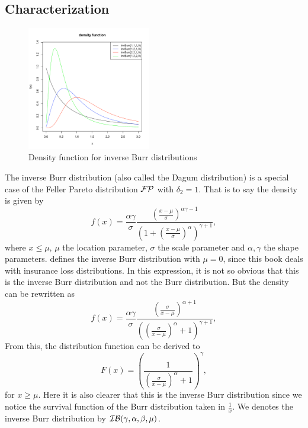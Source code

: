 \subsection{Characterization}
\begin{figure}
  \vspace{-40pt}
  \begin{center}
    \includegraphics[width=0.48\textwidth]{img/invburrzoom}
  \end{center}
  \vspace{-20pt}  
  \caption{Density function for inverse Burr distributions}
  \vspace{-20pt}  
\end{figure}
The inverse Burr distribution (also called the Dagum distribution) is a special case of the Feller Pareto distribution $\mathcal F\mathcal P$ with $\delta_2=1$. That is to say the density is given by
$$
f(x) = \frac{\alpha\gamma}{\sigma} \frac{\left(\frac{x-\mu}{\sigma}\right)^{\alpha\gamma-1}}{\left(1+\left(\frac{x-\mu}{\sigma}\right)^{\alpha}\right)^{\gamma+1}},
$$
where $x\leq \mu$, $\mu$ the location parameter, $\sigma $ the scale parameter and $\alpha,\gamma$ the shape parameters. \cite{klugman} defines the inverse Burr distribution with $\mu=0$, 
since this book deals with insurance loss distributions. In this expression, it is not so obvious that this is the inverse Burr distribution and not the Burr distribution. But the density can be rewritten as
$$
f(x) = \frac{\alpha\gamma}{\sigma} \frac{\left(\frac{\sigma}{x-\mu}\right)^{\alpha+1}}{\left(\left(\frac{\sigma}{x-\mu}\right)^{\alpha}+1\right)^{\gamma+1}},
$$
From this, the distribution function can be derived to 
$$
F(x) =\left(\frac{1}{\left(\frac{\sigma}{x-\mu}\right)^\alpha+1}\right)^{\gamma},
$$
for $x\geq \mu$. Here it is also clearer that this is the inverse Burr distribution since we notice the survival function of the Burr distribution taken in $\frac{1}{x}$. We denotes the inverse Burr distribution by $\mathcal I\mathcal B(\gamma,\alpha,\beta,\mu)$.

